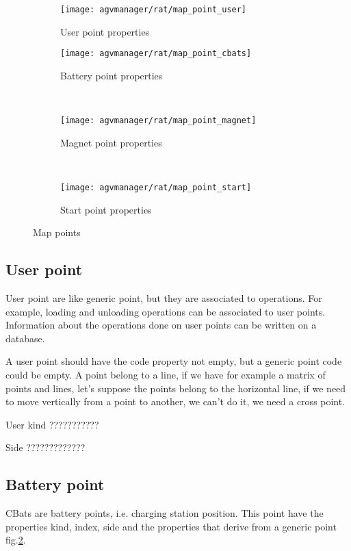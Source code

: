 \begin{figure}[h]
	\centering
	\begin{subfigure}{0.3\textwidth}
		\texttt{[image: agvmanager/rat/map\_point\_user]}
		\caption{User point properties}
		\label{fig:userpoint}
	\end{subfigure}
	\begin{subfigure}{0.3\textwidth}
		\texttt{[image: agvmanager/rat/map\_point\_cbats]}
		\caption{Battery point properties}
		\label{fig:cbatpoint}
	\end{subfigure}
	~ %
	
	\begin{subfigure}{0.3\textwidth}
		\texttt{[image: agvmanager/rat/map\_point\_magnet]}
		\caption{Magnet point properties}
		\label{fig:magnetpoint}
	\end{subfigure}
	~ %
	\begin{subfigure}{0.3\textwidth}
		\texttt{[image: agvmanager/rat/map\_point\_start]}
		\caption{Start point properties}
		\label{fig:startpoint}
	\end{subfigure}
	
	\caption{Map points}\label{fig:animals}
\end{figure}


\subsection{User point}
User point are like generic point, but they are associated to operations. For example, loading and unloading operations can be associated to user points. Information about the operations done on user points can be written on a database.

A user point should have the code property not empty, but a generic point code could be empty. A point belong to a line, if we have for example a matrix of points and lines, let's suppose the points belong to the horizontal line, if we need to move vertically from a point to another, we can't do it, we need a cross point.


User kind ???????????

Side ?????????????

\subsection{Battery point}
CBats are battery points, i.e. charging station position. This point have the properties kind, index, side and the properties that derive from a generic point fig.\ref{fig:cbatpoint}.

